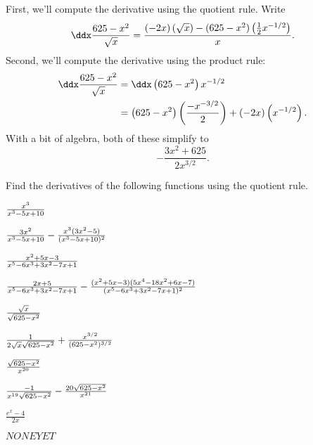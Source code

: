 \begin{solution} 
First, we'll compute the derivative using the quotient rule. Write
\[
\ddx \frac{625-x^2}{\sqrt{x}} = \frac{\left(-2x\right)\left(\sqrt{x}\right) - (625-x^2)\left(\frac{1}{2}x^{-1/2}\right)}{x}.
\]
Second, we'll compute the derivative using the product rule:
\begin{align*}
\ddx \frac{625-x^2}{\sqrt{x}} &= \ddx \left(625-x^2\right)x^{-1/2}\\
&=\left(625-x^2\right)\left(\frac{-x^{-3/2}}{2}\right)+ (-2x)\left(x^{-1/2}\right).
\end{align*}
With a bit of algebra, both of these simplify to
\[
-\frac{3x^2+625}{2x^{3/2}}.
\]
\end{solution}


\begin{exercises}

\noindent Find the derivatives of the following functions using the
quotient rule.

\twocol

\begin{exercise} ${x^3\over x^3-5x+10}$
\begin{answer} ${3x^2\over x^3-5x+10}-{x^3(3x^2-5)\over (x^3-5x+10)^2}$
\end{answer}\end{exercise}

\begin{exercise} ${x^2+5x-3\over x^5-6x^3+3x^2-7x+1}$
\begin{answer} ${2x+5\over x^5-6x^3+3x^2-7x+1}-
{(x^2+5x-3)(5x^4-18x^2+6x-7)\over(x^5-6x^3+3x^2-7x+1)^2}$
\end{answer}\end{exercise}

\ssk
\begin{exercise} ${\sqrt{x}\over\sqrt{625-x^2}}$
\begin{answer} ${1\over 2\sqrt{x}\sqrt{625-x^2}}+{x^{3/2}\over(625-x^2)^{3/2}}$
\end{answer}\end{exercise}

\begin{exercise} ${\sqrt{625-x^2}\over x^{20}}$
\begin{answer} ${-1\over x^{19}\sqrt{625-x^2}}-{20\sqrt{625-x^2}\over x^{21}}$
\end{answer}\end{exercise}

\begin{exercise} $\frac{e^x-4}{2x}$
\begin{answer} $NONE YET$
\end{answer}\end{exercise}
\endtwocol
\bsk


\end{exercises}
